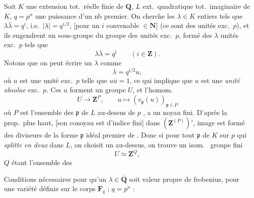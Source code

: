 \documentclass[11pt,a4paper]{article}
\begin{document}
Soit $K$ une extension \struck{\ill{}} tot.\ réelle finie de $\mathbf{Q}$,
$L$ ext.\ quadratique tot.\ imaginaire de $K$, $q = p^{n}$ une puissance
d'un nb premier. On cherche les $\lambda \in K$ entiers tels que $\lambda\bar{\lambda} = q^{i}$, i.e.\ $|\lambda| = q^{i/2}$, [pour un $i$ convenable $\in \mathbf{N}$] (ce sont
des unités exc.\ $p$), et ils engendrent  un
sous-groupe du groupe \struck{\ill{}} des unités exc.\ $p$,
\struck{\ill{}} formé des $\lambda$
unités exc.\ $p$ tels que
\[
  \lambda\bar{\lambda} = q^{i} \qquad (i \in \mathbf{Z}) .
\]
Notons que \struck{\ill{}}   on peut écrire un $\lambda$ 
\ill{} comme
\[
  \lambda = q^{i/2}u ,
\]
où $u$ est une unité exc.\ $p$ telle que $u\bar{u} = 1$, ce qui implique
que $u$ est une \emph{unité absolue} exc.\ $p$. Ces $u$ forment un groupe
$U$, et l'homom.
\[
  U \longrightarrow \mathbf{Z}^{P} , \qquad
  u \mapsto (v_{\mathfrak{p}}(u))_{\mathfrak{p} \in P}
\]
où $P$ est l'ensemble des $\mathfrak{p}$ de $L$ au-dessus de $p$
\ill{}, a un noyau fini. D'après la prop.\ plus haut, [son conoyau est
d'indice fini] \ill{} dans $(\mathbf{Z}^{(P)})'$, \ill{} image est
\ill{} formé des diviseurs de la forme
 \ill{} $\mathfrak{p}$ \ill{} idéal
premier de \ill{}.
Donc si pour tout $\mathfrak{p}$ \ill{} de $K$ sur $p$ qui
\emph{splitte en deux} dans $L$, on choisit un \ill{} au-dessus, on
trouve un isom.\ \ill{} groupe fini
\[
  U \simeq \mathbf{Z}^{Q} ,
\]
$Q$ étant l'ensemble des \ill{}

Conditions nécessaires pour qu'un $\lambda \in \overline{\mathbf{Q}}$ soit
valeur propre \struck{\ill{}} de frobenius, pour une variété
 \ill{} définie sur le corps $\mathbf{F}_q$ ;
$q = p^{n}$ :

\end{document}
